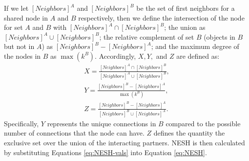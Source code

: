 If we let $\left[Neighbors\right]^A$ and $\left[Neighbors\right]^B$ be the set of first neighbors for a shared node in $A$ and $B$ respectively, then we define the intersection of the node for set $A$ and $B$ with $\left[Neighbors\right]^A \cap \left[Neighbors\right]^B$; the union as $\left[Neighbors\right]^A \cup \left[Neighbors\right]^B$; the relative complement of set $B$ (objects in $B$ but not in $A$) as $\left[Neighbors\right]^B - \left[Neighbors\right]^A$; and the maximum degree of the nodes in $B$ as $\max\left(k^B\right)$. Accordingly, $X,Y,$ and $Z$ are defined as:
\begin{equation}\label{eq:NESH-vals}
    \begin{split}
        X = \frac{\left[Neighbors\right]^A \cap \left[Neighbors\right]^B}{\left[Neighbors\right]^A \cup \left[Neighbors\right]^B}, \\
        Y = \frac{\left[Neighbors\right]^B - \left[Neighbors\right]^A}{\max \left(k^B\right)}, \\
        Z = \frac{\left[Neighbors\right]^B - \left[Neighbors\right]^A}{\left[Neighbors\right]^B \cup \left[Neighbors\right]^A}.
    \end{split}
\end{equation}
Specifically, $Y$ represents the unique connections in $B$ compared to the possible number of connections that the node can have. $Z$ defines the quantity the exclusive set over the union of the interacting partners.  \acrshort{NESH} is then calculated by substituting Equations \ref{eq:NESH-vals} into Equation \ref{eq:NESH}.

